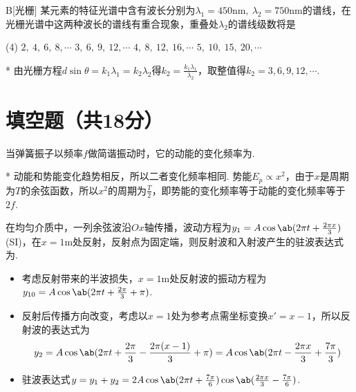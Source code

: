 \begin{choice}{B}[光栅]
    某元素的特征光谱中含有波长分别为$\lambda_1=450\mathrm{nm},\ \lambda_2=750\mathrm{nm}$的谱线，在光栅光谱中这两种波长的谱线有重合现象，重叠处$\lambda_2$的谱线级数将是
\begin{tasks}(4)
    \task $2,\ 4,\ 6,\ 8,\cdots$
    \task $3,\ 6,\ 9,\ 12,\cdots$
    \task $4,\ 8,\ 12,\ 16,\cdots$
    \task $5,\ 10,\ 15,\ 20,\cdots$
\end{tasks}
\end{choice}
\begin{solution}*
    由光栅方程$d\sin\theta=k_1\lambda_1=k_2\lambda_2$得$k_2=\frac{k_1\lambda_1}{\lambda_2}$，取整值得$k_2=3,6,9,12,\cdots$.
\end{solution}

\section{填空题（共18分）}
\begin{problem}[弹簧振子][3]
    当弹簧振子以频率$f$做简谐振动时，它的动能的变化频率为.
\end{problem}
\begin{solution}*
    动能和势能变化趋势相反，所以二者变化频率相同. 势能$E_p\propto x^2$，由于$x$是周期为$T$的余弦函数，所以$x^2$的周期为$\frac T2$，即势能的变化频率等于动能的变化频率等于$2f$.
\end{solution}

\begin{problem}[驻波][3]
    在均匀介质中，一列余弦波沿$Ox$轴传播，波动方程为$y_1=A\cos\ab(2\pi t+\frac{2\pi x}3)$ (SI)，在$x=1\mathrm{m}$处反射，反射点为固定端，则反射波和入射波产生的驻波表达式为.
\end{problem}
\begin{solution}
\begin{itemize}
    \item 考虑反射带来的半波损失，$x=1\mathrm{m}$处反射波的振动方程为$y_{10}=A\cos\ab(2\pi t+\frac{2\pi}{3}+\pi)$.
    \item 反射后传播方向改变，考虑以$x=1$处为参考点需坐标变换$x'=x-1$，所以反射波的表达式为
    \[y_2=A\cos\ab(2\pi t+\frac{2\pi}{3}-\frac{2\pi(x-1)}3+\pi)=A\cos\ab(2\pi t-\frac{2\pi x}{3}+\frac{7\pi}3)\]
    \item 驻波表达式$y=y_1+y_2=2A\cos{\ab(2\pi t+\frac{7\pi}6)}\cos{\ab(\frac{2\pi x}{3}-\frac{7\pi}{6})}$.
\end{itemize}
\end{solution}

